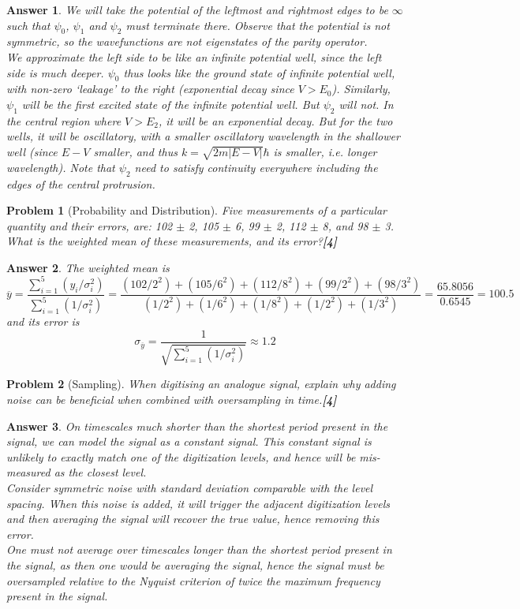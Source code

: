 \documentclass[a4paper]{article}
\newtheorem{ans}{Answer}[subsection]
\theoremstyle{new}
\newtheorem{qns}{Problem}[subsection]
\begin{document}
\begin{ans}
We will take the potential of the leftmost and rightmost edges to be $\infty$ such that $\psi_0$, $\psi_1$ and $\psi_2$ must terminate there. Observe that the potential is not symmetric, so the wavefunctions are not eigenstates of the parity operator.\\[5pt]
We approximate the left side to be like an infinite potential well, since the left side is much deeper. $\psi_0$ thus looks like the ground state of infinite potential well, with non-zero `leakage' to the right (exponential decay since $V>E_0$). Similarly, $\psi_1$ will be the first excited state of the infinite potential well. But $\psi_2$ will not. In the central region where $V>E_2$, it will be an exponential decay. But for the two wells, it will be oscillatory, with a smaller oscillatory wavelength in the shallower well (since $E-V$ smaller, and thus $k=\sqrt{2m|E-V|}{\hbar}$ is smaller, i.e. longer wavelength). Note that $\psi_2$ need to satisfy continuity everywhere including the edges of the central protrusion.
\end{ans}
\newpage
\begin{qns}[Probability and Distribution]
Five measurements of a particular quantity and their errors, are: 102 $\pm$ 2, 105 $\pm$ 6, 99 $\pm$ 2, 112 $\pm$ 8, and 98 $\pm$ 3. What is the weighted mean of these measurements, and its error?\hfill\textbf{[4]}
\end{qns}
\begin{ans}
The weighted mean is
$$\overline{y}=\frac{\sum_{i=1}^5(y_i/\sigma_i^2)}{\sum_{i=1}^5(1/\sigma_i^2)}=\frac{(102/2^2)+(105/6^2)+(112/8^2)+(99/2^2)+(98/3^2)}{(1/2^2)+(1/6^2)+(1/8^2)+(1/2^2)+(1/3^2)}=\frac{65.8056}{0.6545}=100.5$$
and its error is 
$$\sigma_{\overline{y}}=\frac{1}{\sqrt{\sum_{i=1}^5(1/\sigma_i^2)}}\approx 1.2$$
\end{ans}
\begin{qns}[Sampling]
When digitising an analogue signal, explain why adding noise can be beneficial when combined with oversampling in time.\hfill\textbf{[4]}
\end{qns}
\begin{ans}
On timescales much shorter than the shortest period present in the signal, we can model the signal as a constant signal. This constant signal is unlikely to exactly match one of the digitization levels, and hence will be mis-measured as the closest level.\\[5pt]
Consider symmetric noise with standard deviation comparable with the level spacing. When this noise is added, it will trigger the adjacent digitization levels and then averaging the signal will recover the true value, hence removing this error.\\[5pt]
One must not average over timescales longer than the shortest period present in the signal, as then one would be averaging the signal, hence the signal must be oversampled relative to the Nyquist criterion of twice the maximum frequency present in the signal.
\end{ans}
\newpage
\end{document}
